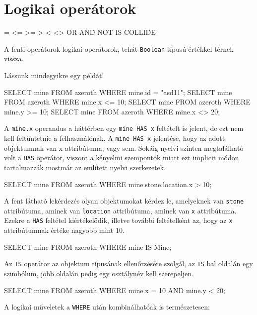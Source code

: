 \section{Logikai operátorok}

\begin{sql}
=  <=  >=  >  <  <>
OR  AND  NOT  IS  COLLIDE
\end{sql}

A fenti operátorok logikai operátorok, tehát \texttt{Boolean} típusú értékkel térnek vissza.

Lássunk mindegyikre egy példát!

\begin{sql}
SELECT mine FROM azeroth WHERE mine.id = "asd11";
SELECT mine FROM azeroth WHERE mine.x <= 10;
SELECT mine FROM azeroth WHERE mine.y >= 10;
SELECT mine FROM azeroth WHERE mine.x <> 20;
\end{sql}

A \texttt{mine.x} operandus a háttérben egy \texttt{mine HAS x} feltételt is jelent, de ezt nem kell feltüntetnie a felhasználónak. A \texttt{mine HAS x} jelentése, hogy az adott objektumnak van x attribútuma, vagy sem. Sokáig nyelvi szinten megtalálható volt a \texttt{HAS} operátor, viszont a kényelmi szempontok miatt ezt implicit módon tartalmazzák mostmár az említett nyelvi szerkezetek.
 
\begin{sql}
SELECT mine FROM azeroth WHERE mine.stone.location.x > 10;
\end{sql}

A fent látható lekérdezés olyan objektumokat kérdez le, amelyeknek van \texttt{stone} attribútuma, aminek van \texttt{location} attribútuma, aminek van \texttt{x} attribútuma. Ezekre a \texttt{HAS} feltétel kiértékelődik, illetve további feltételként az, hogy az \texttt{x} attribútumnak értéke nagyobb mint 10.

\begin{sql}
SELECT mine FROM azeroth WHERE mine IS Mine;
\end{sql}

Az \texttt{IS} operátor az objektum típusának ellenőrzésére szolgál, az \texttt{IS} bal oldalán egy szimbólum, jobb oldalán pedig egy osztálynév kell szerepeljen.

\begin{sql}
SELECT mine FROM azeroth WHERE mine.x = 10 AND mine.y < 20;
\end{sql}

A logikai műveletek a \texttt{WHERE} után kombinálhatóak is természetesen:

